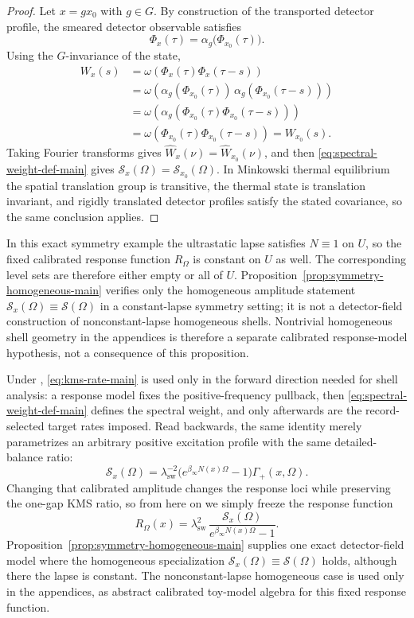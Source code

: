 \begin{proof}
Let $x=gx_0$ with $g\in G$. By construction of the transported detector profile, the smeared detector observable satisfies
\[
\Phi_x(\tau)=\alpha_g\!\bigl(\Phi_{x_0}(\tau)\bigr).
\]
Using the $G$-invariance of the state,
\[
\begin{aligned}
W_x(s)
&=\omega\!\left(\Phi_x(\tau)\Phi_x(\tau-s)\right) \\
&=\omega\!\left(\alpha_g(\Phi_{x_0}(\tau))\,\alpha_g(\Phi_{x_0}(\tau-s))\right) \\
&=\omega\!\left(\alpha_g(\Phi_{x_0}(\tau)\Phi_{x_0}(\tau-s))\right) \\
&=\omega\!\left(\Phi_{x_0}(\tau)\Phi_{x_0}(\tau-s)\right)
=W_{x_0}(s).
\end{aligned}
\]
Taking Fourier transforms gives $\widehat W_x(\nu)=\widehat W_{x_0}(\nu)$, and then \eqref{eq:spectral-weight-def-main} gives $\mathcal S_x(\Omega)=\mathcal S_{x_0}(\Omega)$. In Minkowski thermal equilibrium the spatial translation group is transitive, the thermal state is translation invariant, and rigidly translated detector profiles satisfy the stated covariance, so the same conclusion applies.
\end{proof}

In this exact symmetry example the ultrastatic lapse satisfies $N\equiv 1$ on
$U$, so the fixed calibrated response function $R_\Omega$ is constant on $U$ as
well. The corresponding level sets are therefore either empty or all of $U$.
Proposition~\ref{prop:symmetry-homogeneous-main} verifies only the homogeneous
amplitude statement $\mathcal S_x(\Omega)\equiv\mathcal S(\Omega)$ in a
constant-lapse symmetry setting; it is not a detector-field construction of
nonconstant-lapse homogeneous shells. Nontrivial homogeneous shell geometry in
the appendices is therefore a separate calibrated response-model hypothesis,
not a consequence of this proposition.

Under , \eqref{eq:kms-rate-main} is used only in the
forward direction needed for shell analysis: a response model fixes the
positive-frequency pullback, then \eqref{eq:spectral-weight-def-main} defines
the spectral weight, and only afterwards are the record-selected target rates
imposed. Read backwards, the same identity merely parametrizes an arbitrary
positive excitation profile with the same detailed-balance ratio:
\[
\mathcal S_x(\Omega)=
\lambda_{\mathrm{sw}}^{-2}\bigl(e^{\beta_\infty N(x)\Omega}-1\bigr)\Gamma_+(x,\Omega).
\]
Changing that calibrated amplitude changes the response loci while preserving the
one-gap KMS ratio, so from here on we simply freeze the response function
\begin{equation}\label{eq:response-function-main}
R_\Omega(x)=
\lambda_{\mathrm{sw}}^2\,
\frac{\mathcal S_x(\Omega)}{e^{\beta_\infty N(x)\Omega}-1}.
\end{equation}
Proposition~\ref{prop:symmetry-homogeneous-main} supplies one exact
detector-field model where the homogeneous specialization
$\mathcal S_x(\Omega)\equiv\mathcal S(\Omega)$ holds, although there the lapse
is constant. The nonconstant-lapse homogeneous case is used only in the
appendices, as abstract calibrated toy-model algebra for this fixed response
function.

